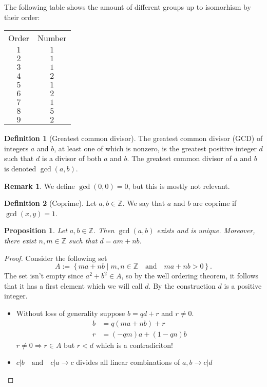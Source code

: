 \documentclass[11pt,a4paper]{article}
\theoremstyle{definition}
\newtheorem{definition}{Definition}[section]
\newtheorem{remark}{Remark}[section]
\theoremstyle{plain}
\newtheorem{proposition}[theorem]{Proposition}
\newcommand{\Z}{\mathbb{Z}}
\newcommand{\tand}{\quad \text{and} \quad}
\newcommand{\set}[2]{ \left\{ #1 \mid #2 \right\} }
\begin{document}
  The following table shows the amount of different groups up to isomorhism
  by their order:
  \begin{center}
    \begin{tabular}{c | c}
        Order & Number \\
        \cline{1-2}
        $1$ & $1$ \\
        $2$ & $1$ \\
        $3$ & $1$ \\
        $4$ & $2$ \\
        $5$ & $1$ \\
        $6$ & $2$ \\
        $7$ & $1$ \\
        $8$ & $5$ \\
        $9$ & $2$
    \end{tabular}
  \end{center}

  \begin{definition}[Greatest common divisor]
    The greatest common divisor (GCD) of integers $a$ and $b$,
    at least one of which is nonzero,
    is the greatest positive integer $d$ such that $d$ is a divisor of 
    both $a$ and $b$.
    The greatest common divisor of $a$ and $b$ is denoted $\gcd(a,b)$.
  \end{definition}
  \begin{remark}
    We define $\gcd(0,0) = 0$, but this is mostly not relevant.
  \end{remark}

  \begin{definition}[Coprime]
    Let $a,b \in \Z$.
    We say that $a$ and $b$ are coprime if $\gcd(x,y) = 1$.
  \end{definition}

  \begin{proposition}
    Let $a,b \in \Z$. Then $\gcd(a,b)$ exists and is unique.
    Moreover, there exist $n,m \in \Z$ such that $d = am + nb$.
  \end{proposition}
  \begin{proof}
	Consider the following set
	\[
    A := \set{ma + nb}{m,n \in\Z \tand ma + nb > 0}.
	\]
	The set isn't empty since $a^2 + b^2 \in A$,
  so by the well ordering theorem, it follows that it has a first element 
  which we will call $d$.
  By the construction $d$ is a positive integer.

	\begin{itemize}
		\item Without loss of generality suppose $b=qd+r$ and $r\ne 0$.
		\begin{align*}
			b &= q (ma + nb) + r \\
			r &= (-qm) a + (1 - qn) b
		\end{align*}
		$r \neq 0 \Rightarrow r \in A$ but $r < d$ which is a contradiciton!
		\item $c|b \quad\mathrm{and}\quad c|a \rightarrow c$ divides all linear 
      combinations of $a,b\rightarrow c|d$
	\end{itemize}
  \end{proof}
\end{document}
